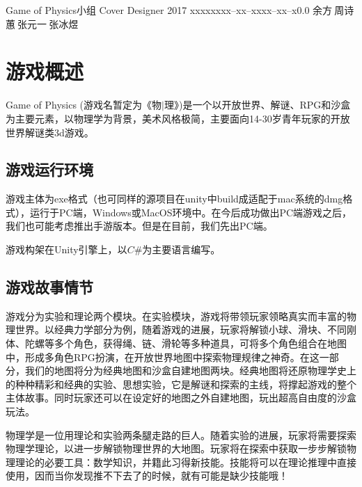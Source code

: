 \documentclass{tstextbook}
\begin{document}
       {Game of Physics小组}
       {Cover Designer}
       {2017}
       {xxxxx}{xxx--xx--xxxx--xx--x}{0.0}
       {余方$\ $周诗蕙$\ $张元一$\ $张冰煜}


\chapter{游戏概述}

\begin{summary}
  Game of Physics (游戏名暂定为《物$|$理》)是一个以开放世界、解谜、RPG和沙盒为主要元素，以物理学为背景，美术风格极简，主要面向14-30岁青年玩家的开放世界解谜类3d游戏。
\end{summary}

\section{游戏运行环境}

游戏主体为exe格式（也可同样的源项目在unity中build成适配于mac系统的dmg格式），运行于PC端，Windows或MacOS环境中。在今后成功做出PC端游戏之后，我们也可能考虑推出手游版本。但是在目前，我们先出PC端。

游戏构架在Unity引擎上，以$C\#$为主要语言编写。

\section{游戏故事情节}

游戏分为实验和理论两个模块。在实验模块，游戏将带领玩家领略真实而丰富的物理世界。以经典力学部分为例，随着游戏的进展，玩家将解锁小球、滑块、不同刚体、陀螺等多个角色，获得绳、链、滑轮等多种道具，可将多个角色组合在地图中，形成多角色RPG扮演，在开放世界地图中探索物理规律之神奇。在这一部分，我们的地图将分为经典地图和沙盒自建地图两块。经典地图将还原物理学史上的种种精彩和经典的实验、思想实验，它是解谜和探索的主线，将撑起游戏的整个主体故事。同时玩家还可以在设定好的地图之外自建地图，玩出超高自由度的沙盒玩法。

物理学是一位用理论和实验两条腿走路的巨人。随着实验的进展，玩家将需要探索物理学理论，以进一步解锁物理世界的大地图。玩家将在探索中获取一步步解锁物理理论的必要工具：数学知识，并籍此习得新技能。技能将可以在理论推理中直接使用，因而当你发现推不下去了的时候，就有可能是缺少技能哦！
\end{document}
